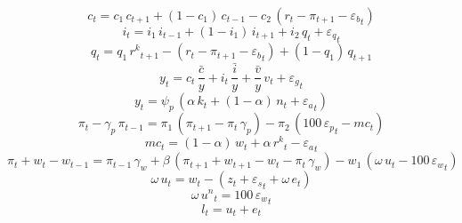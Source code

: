 \begin{dmath}
{{c}}_{t}={{c_1}}\, {{c}}_{t+1}+\left(1-{{c_1}}\right)\, {{c}}_{t-1}-{{c_2}}\, \left({{r}}_{t}-{{\pi}}_{t+1}-{{\varepsilon_b}}_{t}\right)
\end{dmath}
\begin{dmath}
{{i}}_{t}={{i_1}}\, {{i}}_{t-1}+\left(1-{{i_1}}\right)\, {{i}}_{t+1}+{{i_2}}\, {{q}}_{t}+{{\varepsilon_q}}_{t}
\end{dmath}
\begin{dmath}
{{q}}_{t}={{q_1}}\, {{r^{k}}}_{t+1}-\left({{r}}_{t}-{{\pi}}_{t+1}-{{\varepsilon_b}}_{t}\right)+\left(1-{{q_1}}\right)\, {{q}}_{t+1}
\end{dmath}
\begin{dmath}
{{y}}_{t}={{c}}_{t}\, {{\frac{\bar{c}}{y}}}+{{i}}_{t}\, {{\frac{\bar{i}}{y}}}+{{\frac{\bar{v}}{y}}}\, {{v}}_{t}+{{\varepsilon_g}}_{t}
\end{dmath}
\begin{dmath}
{{y}}_{t}={{\psi_p}}\, \left({{\alpha}}\, {{k}}_{t}+\left(1-{{\alpha}}\right)\, {{n}}_{t}+{{\varepsilon_a}}_{t}\right)
\end{dmath}
\begin{dmath}
{{\pi}}_{t}-{{\gamma_p}}\, {{\pi}}_{t-1}={{\pi_1}}\, \left({{\pi}}_{t+1}-{{\pi}}_{t}\, {{\gamma_p}}\right)-{{\pi_2}}\, \left(100\, {{\varepsilon_p}}_{t}-{{mc}}_{t}\right)
\end{dmath}
\begin{dmath}
{{mc}}_{t}=\left(1-{{\alpha}}\right)\, {{w}}_{t}+{{\alpha}}\, {{r^{k}}}_{t}-{{\varepsilon_a}}_{t}
\end{dmath}
\begin{dmath}
{{\pi}}_{t}+{{w}}_{t}-{{w}}_{t-1}={{\pi}}_{t-1}\, {{\gamma_w}}+{{\beta}}\, \left({{\pi}}_{t+1}+{{w}}_{t+1}-{{w}}_{t}-{{\pi}}_{t}\, {{\gamma_w}}\right)-{{w_1}}\, \left({{\omega}}\, {{u}}_{t}-100\, {{\varepsilon_w}}_{t}\right)
\end{dmath}
\begin{dmath}
{{\omega}}\, {{u}}_{t}={{w}}_{t}-\left({{z}}_{t}+{{\varepsilon_s}}_{t}+{{\omega}}\, {{e}}_{t}\right)
\end{dmath}
\begin{dmath}
{{\omega}}\, {{u^{n}}}_{t}=100\, {{\varepsilon_w}}_{t}
\end{dmath}
\begin{dmath}
{{l}}_{t}={{u}}_{t}+{{e}}_{t}
\end{dmath}
